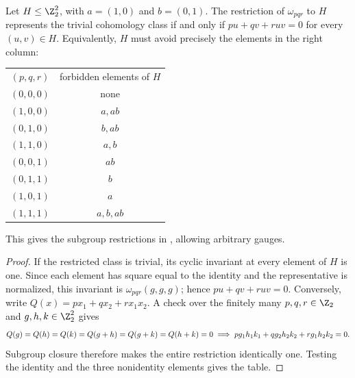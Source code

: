 \begin{lemma}
    \label{thm:asymex_klein_subgroup_table}
    \leanok
    Let $H\leq\Z_2^2$, with $a=(1,0)$ and $b=(0,1)$.
    The restriction of $\omega_{pqr}$ to $H$ represents the trivial
    cohomology class if and only if $pu+qv+ruv=0$ for every $(u,v)\in H$.
    Equivalently, $H$ must avoid precisely the elements in the right column:
    \begin{center}
        \begin{tabular}{c@{\qquad}c}
            $(p,q,r)$ & forbidden elements of $H$ \\[2pt]
            $(0,0,0)$ & none                      \\
            $(1,0,0)$ & $a,ab$                    \\
            $(0,1,0)$ & $b,ab$                    \\
            $(1,1,0)$ & $a,b$                     \\
            $(0,0,1)$ & $ab$                      \\
            $(0,1,1)$ & $b$                       \\
            $(1,0,1)$ & $a$                       \\
            $(1,1,1)$ & $a,b,ab$
        \end{tabular}
    \end{center}
    This gives the subgroup restrictions in
    \cite[Section~6]{GarreRubio2023MPOSym}, allowing arbitrary
    gauges.
\end{lemma}
\begin{proof}
    \leanok
    If the restricted class is trivial, its cyclic invariant at every
    element of $H$ is one. Since each element has square equal to the
    identity and the representative is normalized, this invariant is
    $\omega_{pqr}(g,g,g)$; hence $pu+qv+ruv=0$.
    Conversely, write $Q(x)=px_1+qx_2+rx_1x_2$. A check over the finitely
    many $p,q,r\in\Z_2$ and $g,h,k\in\Z_2^2$ gives
    \begin{align}
        Q(g)=Q(h)=Q(k)=Q(g+h)=Q(g+k)=Q(h+k)=0
        \implies pg_1h_1k_1+qg_2h_2k_2+rg_1h_2k_2=0.
        \notag
    \end{align}
    Subgroup closure therefore makes
    the entire restriction identically one.
    Testing the identity and the three nonidentity elements gives the table.
\end{proof}

